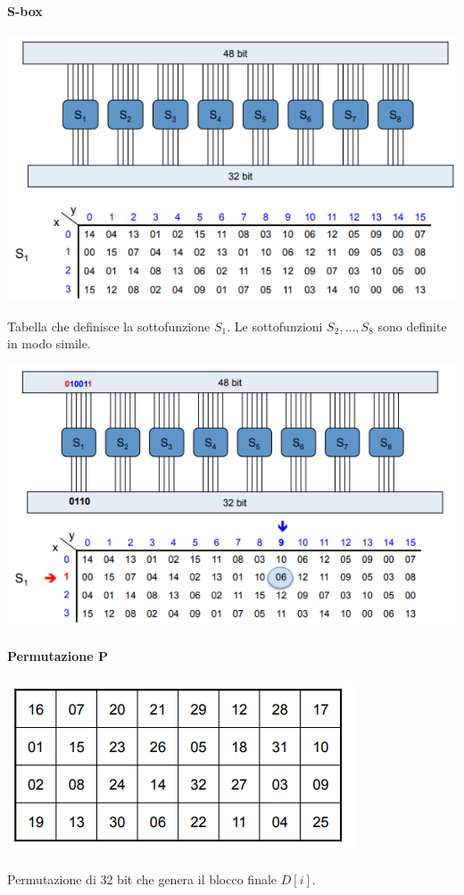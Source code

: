 \documentclass[10pt]{book}
\begin{document}
\paragraph{S-box}
\begin{center}
	\includegraphics[scale=0.75]{12.png}
\end{center}
Tabella che definisce la sottofunzione $S_1$. Le sottofunzioni $S_2,\ldots,S_8$ sono definite in modo simile.
\begin{center}
	\includegraphics[scale=0.75]{13.png}
\end{center}
\pagebreak
\paragraph{Permutazione P}
\begin{center}
	\includegraphics[scale=0.75]{14.png}
\end{center}
Permutazione di 32 bit che genera il blocco finale $D[i]$.
\end{document}
